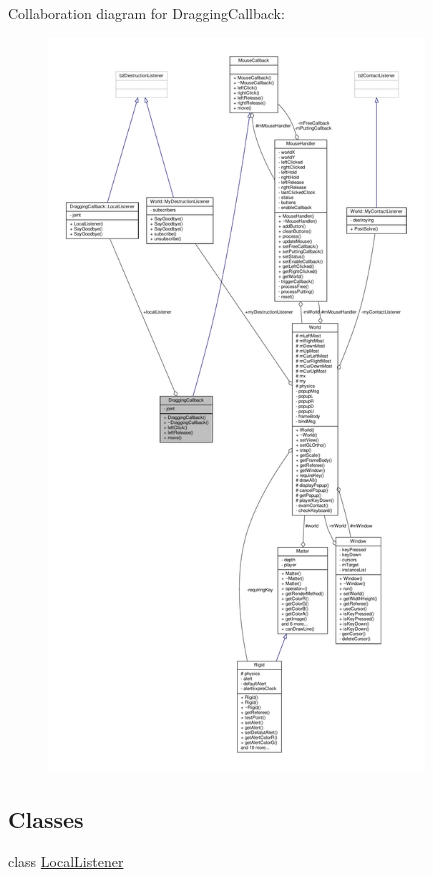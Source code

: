 Collaboration diagram for Dragging\+Callback\+:
\nopagebreak
\begin{figure}[H]
\begin{center}
\leavevmode
\includegraphics[height=550pt]{classDraggingCallback__coll__graph}
\end{center}
\end{figure}
\subsection*{Classes}
\begin{DoxyCompactItemize}
\item 
class \hyperlink{classDraggingCallback_1_1LocalListener}{Local\+Listener}
\end{DoxyCompactItemize}
